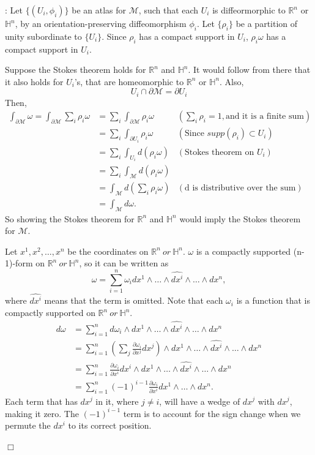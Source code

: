 \documentclass{article}
\theoremstyle{definition}
\theoremstyle{named}
\def\endproofmark{$\Box$}
\newenvironment{proof}{\par\noindent{\bf Proof}:}{\endproofmark\smallskip}
\begin{document}
\begin{proof}
    Let $\{(U_i, \phi_i)\}$ be an atlas for $\mathcal{M}$, such that each $U_i$ is diffeormorphic to $\mathbb{R}^n$ or $\mathbb{H}^n$, by an orientation-preserving diffeomorphism $\phi_i$. Let $\{ \rho_i \}$ be a partition of unity subordinate to $\{ U_i \}$. Since $\rho_i$ has a compact support in $U_i$, $\rho_i \omega$ has a compact support in $U_i$. 

    Suppose the Stokes theorem holds for $\mathbb{R}^n$ and $\mathbb{H}^n$. It would follow from there that it also holds for $U_i$'s, that are homeomorphic to $\mathbb{R}^n$ or $\mathbb{H}^n$. 
    Also,
    \[
        U_i \cap \partial \mathcal{M} = \partial U_i 
    \]
    Then, 
    \begin{align*}
        \int_{\partial \mathcal{M}} \omega = \int_{\partial \mathcal{M}} \sum_i \rho_i \omega &= \sum_i \int_{\partial \mathcal{M}} \rho_i \omega & (\sum_i \rho_i = 1, \text{and it is a finite sum}) \\ 
        &= \sum_i \int_{\partial U_i} \rho_i \omega & (\text{Since } supp(\rho_i) \subset U_i) \\
        &= \sum_i \int_{U_i} d(\rho_i \omega) & (\text{Stokes theorem on } U_i) \\
        &= \sum_i \int_\mathcal{M} d(\rho_i \omega) \\
        &= \int_\mathcal{M} d(\sum_i \rho_i \omega) & (\text{d is distributive over the sum}) \\
        &= \int_\mathcal{M} d\omega .
    \end{align*}
    So showing the Stokes theorem for $\mathbb{R}^n$ and $\mathbb{H}^n$ would imply the Stokes theorem for $\mathcal{M}$.

    Let $x^1, x^2, \ldots, x^n$ be the coordinates on $\mathbb{R}^n  \ or \  \mathbb{H}^n$. $\omega$ is a compactly supported (n-1)-form on $\mathbb{R}^n \ or \ \mathbb{H}^n$, so it can be written as
    \[
        \omega = \sum_{i=1}^n \omega_i dx^1 \wedge \ldots \wedge \widehat{dx^i} \wedge \ldots \wedge dx^n,
    \]
    where $\widehat{dx^i}$ means that the term is omitted. Note that each $\omega_i$ is a function that is compactly supported on $\mathbb{R}^n \ or \ \mathbb{H}^n$. 
    \begin{align*}
        d\omega &= \sum_{i=1}^n d\omega_i \wedge dx^1 \wedge \ldots \wedge \widehat{dx^i} \wedge \ldots \wedge dx^n \\
        &= \sum_{i=1}^n \left(\sum_j \frac{\partial \omega_i}{\partial x^j} dx^j\right) \wedge dx^1 \wedge \ldots \wedge \widehat{dx^i} \wedge \ldots \wedge dx^n\\
        &= \sum_{i=1}^n \frac{\partial \omega_i}{\partial x^i} dx^i \wedge dx^1 \wedge \ldots \wedge \widehat{dx^i} \wedge \ldots \wedge dx^n\\
        &= \sum_{i=1}^n (-1)^{i-1} \frac{\partial \omega_i}{\partial x^i} dx^1 \wedge \ldots \wedge dx^n .
    \end{align*}
    Each term that has $dx^j$ in it, where $j \neq i$, will have a wedge of $dx^j$ with $dx^j$, making it zero. The $(-1)^{i-1}$ term is to account for the sign change when we permute the $dx^i$ to its correct position.


\end{proof}
\end{document}

